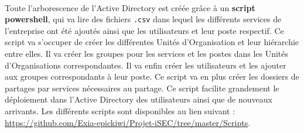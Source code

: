 		\paragraph{}
			Toute l'arborescence de l'Active Directory est créée grâce à un \textbf{script powershell}, qui va lire des fichiers \texttt{.csv} dans lequel les différents services de l'entreprise ont été ajoutés ainsi que les utilisateurs et leur poste respectif. Ce script va s'occuper de créer les différentes Unités d'Organisation et leur hiérarchie entre elles. Il va créer les groupes pour les services et les postes dans les Unités d'Organisations correspondantes. Il va enfin créer les utilisateurs et les ajouter aux groupes correspondants à leur poste. Ce script va en plus créer les dossiers de partages par services nécessaires au partage. Ce script facilite grandement le déploiement dans l'Active Directory des utilisateurs ainsi que de nouveaux arrivants. Les différents scripts sont disponibles au lien suivant : \href{https://github.com/Exia-epickiwi/Projet-iSEC/tree/master/Scripts}{https://github.com/Exia-epickiwi/Projet-iSEC/tree/master/Scripts}.
